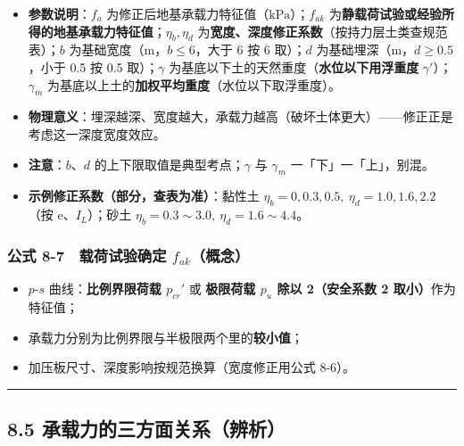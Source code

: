 \documentclass[
]{article}
\providecommand{\tightlist}{%
  \setlength{\itemsep}{0pt}\setlength{\parskip}{0pt}}
\begin{document}
\begin{itemize}
\tightlist
\item
  \textbf{参数说明}：\(f_a\)
  为修正后地基承载力特征值（\(\mathrm{kPa}\)）；\(f_{ak}\)
  为\textbf{静载荷试验或经验所得的地基承载力特征值}；\(\eta_b,\eta_d\)
  为\textbf{宽度、深度修正系数}（按持力层土类查规范表）；\(b\)
  为基础宽度（m，\textbf{\(b\le6\)}，大于 6 按 6 取）；\(d\)
  为基础埋深（m，\textbf{\(d\ge0.5\)}，小于 0.5 按 0.5 取）；\(\gamma\)
  为基底以下土的天然重度（\textbf{水位以下用浮重度}
  \(\gamma'\)）；\(\gamma_m\)
  为基底以上土的\textbf{加权平均重度}（水位以下取浮重度）。
\item
  \textbf{物理意义}：埋深越深、宽度越大，承载力越高（破坏土体更大）------修正正是考虑这一深度宽度效应。
\item
  \textbf{注意}：\(b\)、\(d\) 的上下限取值是典型考点；\(\gamma\) 与
  \(\gamma_m\) 一「下」一「上」，别混。
\item
  \textbf{示例修正系数（部分，查表为准）}：黏性土
  \(\eta_b=0,0.3,0.5,\ \eta_d=1.0,1.6,2.2\)（按 e、\(I_L\)）；砂土
  \(\eta_b=0.3\sim3.0,\ \eta_d=1.6\sim4.4\)。
\end{itemize}

\subsubsection{\texorpdfstring{公式 8-7　载荷试验确定
\(f_{ak}\)（概念）}{公式 8-7　载荷试验确定 f\_\{ak\}（概念）}}\label{ux516cux5f0f-8-7-ux8f7dux8377ux8bd5ux9a8cux786eux5b9a-f_akux6982ux5ff5}

\begin{itemize}
\tightlist
\item
  \(p\)-\(s\) 曲线：\textbf{比例界限荷载 \(p_{cr}'\)} 或
  \textbf{极限荷载 \(p_u\) 除以 2（安全系数 2 取小）}作为特征值；
\item
  承载力分别为比例界限与半极限两个里的\textbf{较小值}；
\item
  加压板尺寸、深度影响按规范换算（宽度修正用公式 8-6）。
\end{itemize}

\begin{center}\rule{0.5\linewidth}{0.5pt}\end{center}

\subsection{8.5
承载力的三方面关系（辨析）}\label{ux627fux8f7dux529bux7684ux4e09ux65b9ux9762ux5173ux7cfbux8fa8ux6790}
\end{document}

